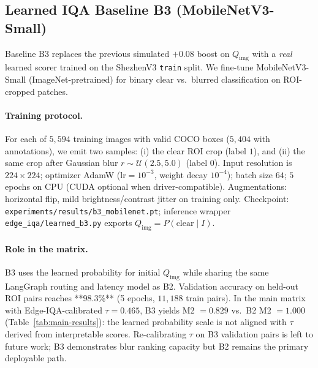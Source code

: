 \subsection{Learned IQA Baseline B3 (MobileNetV3-Small)}
\label{sec:b3-learned}

Baseline B3 replaces the previous simulated $+0.08$ boost on $Q_{\mathrm{img}}$ with a \emph{real} learned scorer trained on the ShezhenV3 \texttt{train} split.
We fine-tune MobileNetV3-Small (ImageNet-pretrained) for binary clear vs.\ blurred classification on ROI-cropped patches.

\paragraph{Training protocol.}
For each of $5{,}594$ training images with valid COCO boxes ($5{,}404$ with annotations), we emit two samples: (i) the clear ROI crop (label $1$), and (ii) the same crop after Gaussian blur $r{\sim}\mathcal{U}(2.5,5.0)$ (label $0$).
Input resolution is $224{\times}224$; optimizer AdamW ($\mathrm{lr}{=}10^{-3}$, weight decay $10^{-4}$); batch size $64$; $5$ epochs on CPU (CUDA optional when driver-compatible).
Augmentations: horizontal flip, mild brightness/contrast jitter on training only.
Checkpoint: \texttt{experiments/results/b3\_mobilenet.pt}; inference wrapper \texttt{edge\_iqa/learned\_b3.py} exports $Q_{\mathrm{img}} = P(\mathrm{clear}\mid I)$.

\paragraph{Role in the matrix.}
B3 uses the learned probability for initial $Q_{\mathrm{img}}$ while sharing the same LangGraph routing and latency model as B2.
Validation accuracy on held-out ROI pairs reaches **98.3\%** (5 epochs, $11{,}188$ train pairs).
In the main matrix with Edge-IQA-calibrated $\tau{=}0.465$, B3 yields M2 $=0.829$ vs.\ B2 M2 $=1.000$ (Table~\ref{tab:main-results}): the learned probability scale is not aligned with $\tau$ derived from interpretable scores.
Re-calibrating $\tau$ on B3 validation pairs is left to future work; B3 demonstrates blur ranking capacity but B2 remains the primary deployable path.
